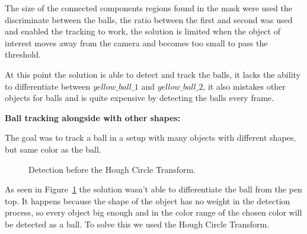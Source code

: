\documentclass[10pt,twocolumn,letterpaper]{article}
\begin{document}
  The size of the connected components regions found in the mask were used the
  discriminate between the balls, the ratio between the first and second was
  used and enabled the tracking to work, the solution is limited when the object
  of interest moves away from the camera and becomes too small to pass the
  threshold.

  At this point the solution is able to detect and track the balls, it lacks the
  ability to differentiate between $yellow\_ball\_1$ and $yellow\_ball\_2$, it
  also mistakes other objects for balls and is quite expensive by detecting the
  balls every frame.

  \bigbreak{}
  \textbf{Ball tracking alongside with other shapes:}
  \bigbreak{}

  The goal was to track a ball in a setup with many objects with different
  shapes, but same color as the ball.

  \begin{figure}[!h]
    \centering
    \setlength{\fboxsep}{1pt}
    \setlength{\fboxrule}{1pt}
    \caption{Detection before the Hough Circle Transform.}\label{fig:not_hough}
  \end{figure}

  As seen in Figure~\ref{fig:not_hough} the solution wasn't able to
  differentiate the ball from the pen top. It happens because the shape of the
  object has no weight in the detection process, so every object big enough and
  in the color range of the chosen color will be detected as a ball. To solve
  this we used the Hough Circle Transform.
\end{document}
